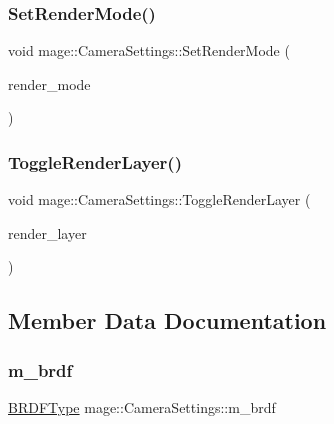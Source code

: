 \subsubsection{\texorpdfstring{Set\+Render\+Mode()}{SetRenderMode()}}
{\footnotesize\ttfamily void mage\+::\+Camera\+Settings\+::\+Set\+Render\+Mode (\begin{DoxyParamCaption}\item[{\hyperlink{namespacemage_a9d24b35ed0bdecf8535e2b91fe0eebba}{Render\+Mode}}]{render\+\_\+mode }\end{DoxyParamCaption})\hspace{0.3cm}{\ttfamily [noexcept]}}

\hypertarget{classmage_1_1_camera_settings_a47c34af7eddc2a0f6256d137b5813a4c}{}\label{classmage_1_1_camera_settings_a47c34af7eddc2a0f6256d137b5813a4c} 
\subsubsection{\texorpdfstring{Toggle\+Render\+Layer()}{ToggleRenderLayer()}}
{\footnotesize\ttfamily void mage\+::\+Camera\+Settings\+::\+Toggle\+Render\+Layer (\begin{DoxyParamCaption}\item[{\hyperlink{namespacemage_a4091cc4d4d64a0fd31fd96c2ef7af761}{Render\+Layer}}]{render\+\_\+layer }\end{DoxyParamCaption})\hspace{0.3cm}{\ttfamily [noexcept]}}



\subsection{Member Data Documentation}
\hypertarget{classmage_1_1_camera_settings_ac6a51ea7c770af79de4f97b53cab83b7}{}\label{classmage_1_1_camera_settings_ac6a51ea7c770af79de4f97b53cab83b7} 
\subsubsection{\texorpdfstring{m\+\_\+brdf}{m\_brdf}}
{\footnotesize\ttfamily \hyperlink{namespacemage_af1044f87544bc38427766a8c795d2f26}{B\+R\+D\+F\+Type} mage\+::\+Camera\+Settings\+::m\+\_\+brdf\hspace{0.3cm}{\ttfamily [private]}}

